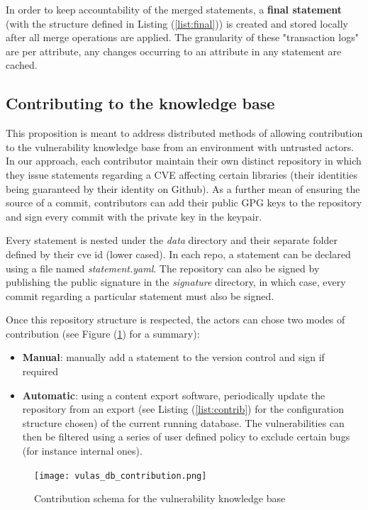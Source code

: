\documentclass[11pt]{article}
\begin{document}
In order to keep accountability of the merged statements, a \textbf{final statement} (with the structure defined in Listing (\ref{list:final})) is created and stored locally after all merge operations are applied. The granularity of these "transaction logs" are per attribute, any changes occurring to an attribute in any statement are cached. 

\subsection{Contributing to the knowledge base}

This proposition is meant to address distributed methods of allowing contribution to the vulnerability knowledge base from an environment with untrusted actors. In our approach, each contributor maintain their own distinct repository in which they issue statements regarding a CVE affecting certain libraries (their identities being guaranteed by their identity on Github). As a further mean of ensuring the source of a commit, contributors can add their public GPG keys to the repository and sign every commit with the private key in the keypair. 

Every statement is nested under the \textit{data} directory and their separate folder defined by their cve id (lower cased). In each repo, a statement can be declared using a file named \textit{statement.yaml}. The repository can also be signed by publishing the public signature in the \textit{signature} directory, in which case, every commit regarding a particular statement must also be signed.

Once this repository structure is respected, the actors can chose two modes of contribution (see Figure (\ref{fig:vulas_db_contribution}) for a summary):

\begin{itemize}
    \item \textbf{Manual}: manually add a statement to the version control and sign if required
    \item \textbf{Automatic}: using a content export software, periodically update the repository from an export (see Listing (\ref{list:contrib}) for the configuration structure chosen) of the current running database. The vulnerabilities can then be filtered using a series of user defined policy to exclude certain bugs (for instance internal ones).
\end{itemize}

\vspace{2mm}
\begin{figure}[h]
    \centering
    \texttt{[image: vulas\_db\_contribution.png]}
    \caption{Contribution schema for the vulnerability knowledge base}
    \label{fig:vulas_db_contribution}
\end{figure}
\end{document}
